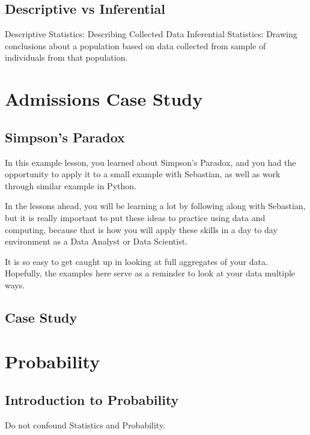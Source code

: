 \documentclass[]{book}
\begin{document}
\subsection{Descriptive vs
Inferential}\label{descriptive-vs-inferential}

Descriptive Statistics: Describing Collected Data Inferential
Statistics: Drawing conclusions about a population based on data
collected from sample of individuals from that population.

\section{Admissions Case Study}\label{admissions-case-study}

\subsection{Simpson's Paradox}\label{simpsons-paradox}

In this example lesson, you learned about Simpson's Paradox, and you had
the opportunity to apply it to a small example with Sebastian, as well
as work through similar example in Python.

In the lessons ahead, you will be learning a lot by following along with
Sebastian, but it is really important to put these ideas to practice
using data and computing, because that is how you will apply these
skills in a day to day environment as a Data Analyst or Data Scientist.

It is so easy to get caught up in looking at full aggregates of your
data. Hopefully, the examples here serve as a reminder to look at your
data multiple ways.

\subsection{Case Study}\label{case-study}

\section{Probability}\label{probability}

\subsection{Introduction to
Probability}\label{introduction-to-probability}

Do not confound Statistics and Probability.
\end{document}
